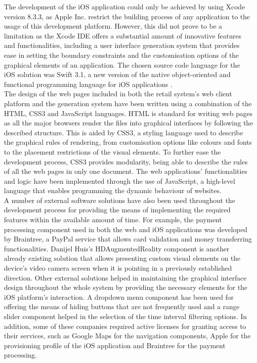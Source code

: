 The development of the iOS application could only be achieved by using Xcode version 8.3.3, as Apple Inc. restrict the building process of any application to the usage of this development platform. However, this did not prove to be a limitation as the Xcode IDE offers a substantial amount of innovative features and functionalities, including a user interface generation system that provides ease in setting the boundary constraints and the customisation options of the graphical elements of an application. The chosen source code language for the iOS solution was Swift 3.1, a new version of the native object-oriented and functional programming language for iOS applications \cite{swift_2014}.\\

The design of the web pages included in both the retail system's web client platform and the generation system have been written using a combination of the HTML, CSS3 and JavaScript languages. HTML is standard for writing web pages as all the major browsers render the files into graphical interfaces by following the described structure. This is aided by CSS3, a styling language used to describe the graphical rules of rendering, from customisation options like colours and fonts to the placement restrictions of the visual elements. To further ease the development process, CSS3 provides modularity, being able to describe the rules of all the web pages in only one document. The web applications' functionalities and logic have been implemented through the use of JavaScript, a high-level language that enables programming the dynamic behaviour of websites\cite{schifreen_2010}.\\

A number of external software solutions have also been used throughout the development process for providing the means of implementing the required features within the available amount of time. For example, the payment processing component used in both the web and iOS applications was developed by Braintree, a PayPal service that allows card validation and money transferring functionalities\cite{braintree}. Danijel Huis's HDAugmentedReality component is another already existing solution that allows presenting custom visual elements on the device's video camera screen when it is pointing in a previously established direction\cite{huis_2017}. Other external solutions helped in maintaining the graphical interface design throughout the whole system by providing the necessary elements for the iOS platform's interaction. A dropdown menu component has been used for offering the means of hiding buttons that are not frequently used and a range slider component helped in the selection of the time interval filtering options. In addition, some of these companies required active licenses for granting access to their services, such as Google Maps for the navigation components, Apple for the provisioning profile of the iOS application and Braintree for the payment processing.\\

